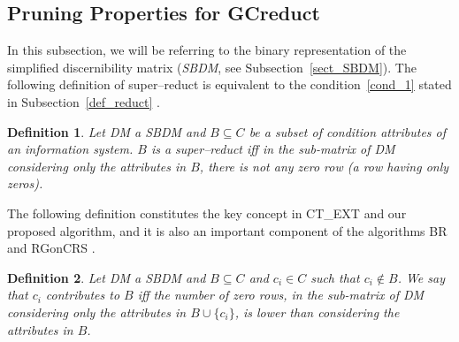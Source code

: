 \documentclass[authoryear,preprint,review,12pt]{elsarticle}
\newtheorem{definition}{Definition}
\begin{document}

  
\subsection{Pruning Properties for GCreduct}\label{properties}
	In this subsection, we will be referring to the binary representation of the simplified discernibility matrix
	(\textit{SBDM}, see Subsection~\ref{sect_SBDM}). The following definition of super--reduct is equivalent to the condition~\ref{cond_1} stated in 
	Subsection~\ref{def_reduct} \citep{Lazo15}.
	
	\begin{definition}\label{def:testor}
		Let DM a SBDM and $B \subseteq C$ be a subset of condition attributes of an information system. $B$ is a super--reduct iff in the sub-matrix of DM considering only the attributes in $B$, there is not any zero row (a row having only zeros).
	\end{definition}
	
	The following definition constitutes the key concept in CT\_EXT \citep{Sanchez07} and our proposed algorithm, and it is also an important component of the algorithms BR \citep{Lias09} and RGonCRS
	\citep{WangP07}.
		
	\begin{definition}\label{def:contrib}
		Let DM a SBDM and $B \subseteq C$ and  $c_i \in C$ such that $c_i \notin B$. We say that $c_i$ contributes to $B$ iff the	number of zero rows, in the sub-matrix of DM considering only the attributes in $B\cup\{c_i\}$, is lower than considering the attributes in $B$.
	\end{definition}		
		
\end{document}
